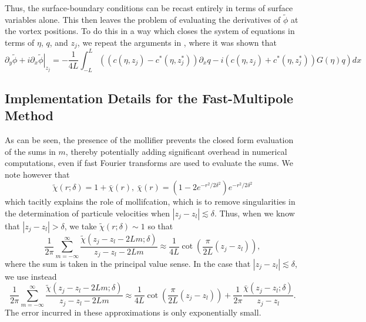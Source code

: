 \documentclass[a4paper,11pt]{article}
\newcommand{\p}{\partial}
\begin{document}
Thus, the surface-boundary conditions can be recast entirely in terms of surface variables alone.  This then leaves the problem of evaluating the derivatives of $\tilde{\phi}$ at the vortex positions.  To do this in a way which closes the system of equations in terms of $\eta$, $q$, and $z_{j}$, we repeat the arguments in \cite{curtis}, where it was shown that 
\[
\left. \p_{y}\tilde{\phi} + i\p_{x}\tilde{\phi}\right|_{z_{j}} = -\frac{1}{4L}\int_{-L}^{L}\left((c(\eta,z_{j})-c^{\ast}(\eta,z^{\ast}_{j}))\p_{x}q - i(c(\eta,z_{j})+c^{\ast}(\eta,z^{\ast}_{j}))G(\eta)q \right)dx
\]
\subsection*{Implementation Details for the Fast-Multipole Method}
As can be seen, the presence of the mollifier prevents the closed form evaluation of the sums in $m$, thereby potentially adding significant overhead in numerical computations, even if fast Fourier transforms are used to evaluate the sums.  We note however that 
\[
\tilde{\chi}(r;\delta) = 1 + \bar{\chi}(r), ~ \bar{\chi}(r) = \left(1-2e^{-r^2/2\delta^{2}} \right)e^{-r^2/2\delta^{2}}
\]
which tacitly explains the role of mollifcation, which is to remove singularities in the determination of particule velocities when $\left|z_{j}-z_{l} \right|\lesssim \delta$.  Thus, when we know that $\left|z_{j}-z_{l} \right| > \delta$, we take $\tilde{\chi}(r;\delta) \sim 1$ so that 
\[
\frac{1}{2\pi}\sum_{m=-\infty}^{\infty} \frac{\tilde{\chi}(z_{j}-z_{l}-2Lm;\delta)}{z_{j}-z_{l}-2Lm} \approx \frac{1}{4L}\cot\left(\frac{\pi}{2L}\left(z_{j}-z_{l}\right) \right),
\]
where the sum is taken in the principal value sense.  In the case that $\left|z_{j}-z_{l} \right|\lesssim \delta$, we use instead 
\[
\frac{1}{2\pi}\sum_{m=-\infty}^{\infty} \frac{\tilde{\chi}(z_{j}-z_{l}-2Lm;\delta)}{z_{j}-z_{l}-2Lm} \approx \frac{1}{4L}\cot\left(\frac{\pi}{2L}\left(z_{j}-z_{l}\right) \right) + \frac{1}{2\pi}\frac{\bar{\chi}(z_{j}-z_{l};\delta)}{z_{j}-z_{l}}.
\]
The error incurred in these approximations is only exponentially small.  
\end{document}
